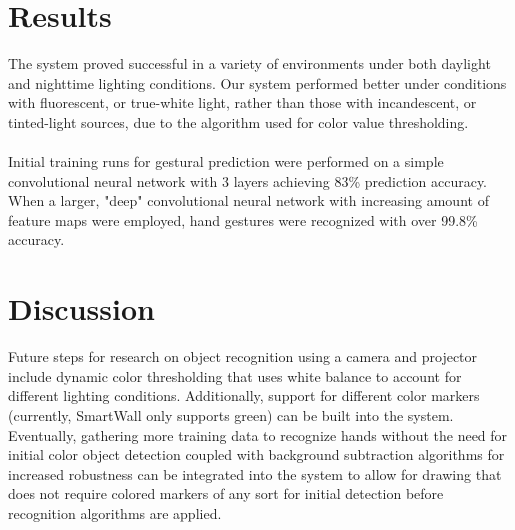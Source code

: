 \documentclass[twoside,twocolumn]{article}
\begin{document}
\section{Results}
The system proved successful in a variety of environments under both daylight and nighttime lighting conditions. Our system performed better under conditions with fluorescent, or true-white light, rather than those with incandescent, or tinted-light sources, due to the algorithm used for color value thresholding. \\ \\Initial training runs for gestural prediction were performed on a simple convolutional neural network with 3 layers achieving 83\% prediction accuracy. When a larger, "deep" convolutional neural network with increasing amount of feature maps were employed, hand gestures were recognized with over 99.8\% accuracy.






\section{Discussion}
Future steps for research on object recognition using a camera and projector include dynamic color thresholding that uses white balance to account for different lighting conditions. Additionally, support for different color markers (currently, SmartWall only supports green) can be built into the system. Eventually, gathering more training data to recognize hands without the need for initial color object detection coupled with background subtraction algorithms for increased robustness can be integrated into the system to allow for drawing that does not require colored markers of any sort for initial detection before recognition algorithms are applied.\\ \\
\end{document}
